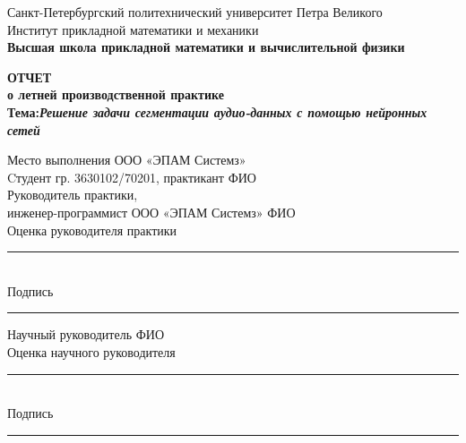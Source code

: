 \documentclass[main.tex]{subfiles}
\begin{document}
\begin{titlepage}
\begin{center}
	\begin{large}
		Санкт-Петербургский политехнический университет Петра Великого\\
		Институт прикладной математики и механики\\
		\textbf{Высшая школа прикладной математики и вычислительной физики}\\
		\hrulefill
	\end{large}
	\vfill
	\Large{\textbf{ОТЧЕТ\\ о летней производственной практике}\\
	\vspace{5mm}\textbf{Тема:\hspace{2mm}\textit{Решение задачи сегментации аудио-данных с помощью нейронных сетей}}
	}
\end{center}
\vfill
Место выполнения \hfill{ООО «ЭПАМ Системз»}\\
\newline
Cтудент гр. 3630102/70201, практикант \hfill{ФИО} \\
\newline
Руководитель практики, \\
инженер-программист ООО «ЭПАМ Системз» \hfill{ФИО}\\
\newline
Оценка руководителя практики\hfill{\rule{3.5cm}{0.5pt}}\\
\newline
Подпись\hfill{\rule{3.5cm}{0.5pt}\vspace{5mm}}
\newline
Научный руководитель \hfill{ФИО}\\
\newline
Оценка научного руководителя\hfill{\rule{3.5cm}{0.5pt}}\\
\newline
Подпись\hfill{\rule{3.5cm}{0.5pt}\vspace{5mm}}
\vfill
{}



\end{titlepage}
\end{document}
